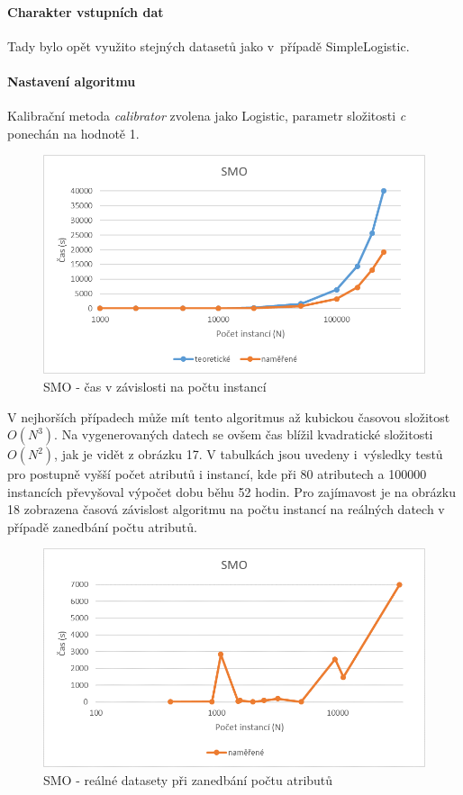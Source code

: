 \documentclass[12pt]{article}
\begin{document}
\newpage
{}
\paragraph{Charakter vstupních dat}
Tady bylo opět využito stejných datasetů jako v~případě SimpleLogistic.
\paragraph{Nastavení algoritmu}
Kalibrační metoda \textit{calibrator} zvolena jako Logistic, parametr složitosti \textit{c} ponechán na hodnotě 1.
\begin{figure}[hbp]
  \centering
  \includegraphics[scale=1]{img/smo.png}
  \caption{SMO - čas v závislosti na počtu instancí}
\end{figure}
V nejhorších případech může mít tento algoritmus až kubickou časovou složitost $O(N^3)$. Na vygenerovaných datech se ovšem čas blížil kvadratické složitosti $O(N^2)$, jak je vidět z obrázku 17. V tabulkách jsou uvedeny i~výsledky testů pro postupně vyšší počet atributů i instancí, kde při 80 atributech a 100000 instancích převyšoval výpočet dobu běhu 52 hodin.
\newline
\indent
Pro zajímavost je na obrázku 18 zobrazena časová závislost algoritmu na počtu instancí na reálných datech v případě zanedbání počtu atributů.
\begin{figure}[hbp]
  \centering
  \includegraphics[scale=1]{img/smoreal.png}
  \caption{SMO - reálné datasety při zanedbání počtu atributů}
\end{figure}
\end{document}
